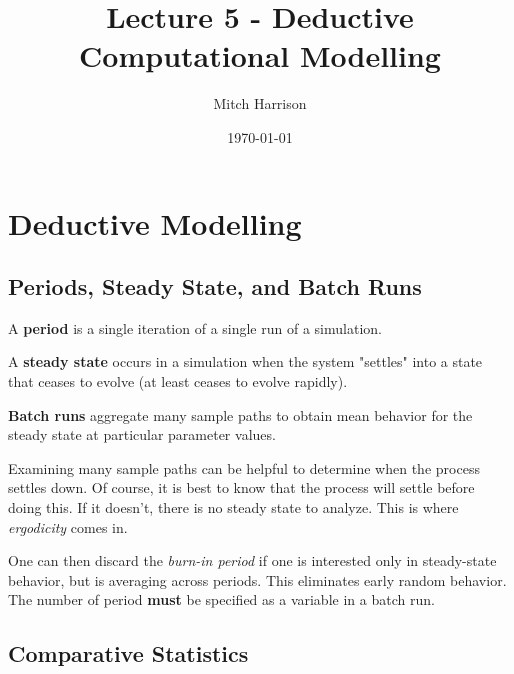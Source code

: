 \documentclass[titlepage, 12pt, leqno]{article}
\title{\Huge{Lecture 5 - Deductive Computational Modelling}}
\author{\large{Mitch Harrison}}
\date{\today}
\begin{document}
\setlength{\parskip}{1\baselineskip}
\setlength{\parindent}{15pt}
\maketitle
\tableofcontents
\newpage


\section{Deductive Modelling}

\subsection{Periods, Steady State, and Batch Runs}

\begin{definition}
    A \textbf{period} is a single iteration of a single run of a simulation.
\end{definition}

\begin{definition}
    A \textbf{steady state} occurs in a simulation when the system "settles" into
    a state that ceases to evolve (at least ceases to evolve rapidly).
\end{definition}

\begin{definition}
    \textbf{Batch runs} aggregate many sample paths to obtain mean behavior for 
    the steady state at particular parameter values.
\end{definition}

Examining many sample paths can be helpful to determine when the process settles
down. Of course, it is best to know that the process will settle before doing 
this. If it doesn't, there is no steady state to analyze. This is where
\textit{ergodicity} comes in.

One can then discard the \textit{burn-in period} if one is interested only in 
steady-state behavior, but is averaging across periods. This eliminates early
random behavior. The number of period \textbf{must} be specified as a variable in
a batch run.

\subsection{Comparative Statistics}
\end{document}
